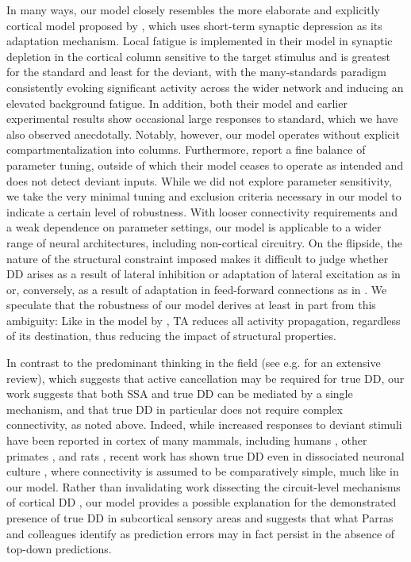 \documentclass[9pt,lineno,onehalfspacing]{elife}
\begin{document}
In many ways, our model closely resembles the more elaborate and explicitly cortical model proposed by \cite{Yarden2017-eh}, which uses short-term synaptic depression as its adaptation mechanism. Local fatigue is implemented in their model in synaptic depletion in the cortical column sensitive to the target stimulus and is greatest for the standard and least for the deviant, with the many-standards paradigm consistently evoking significant activity across the wider network and inducing an elevated background fatigue. In addition, both their model and earlier experimental results \citep{Hershenhoren2014-bb} show occasional large responses to standard, which we have also observed anecdotally. Notably, however, our model operates without explicit compartmentalization into columns. Furthermore, \cite{Yarden2017-eh} report a fine balance of parameter tuning, outside of which their model ceases to operate as intended and does not detect deviant inputs. While we did not explore parameter sensitivity, we take the very minimal tuning and exclusion criteria necessary in our model to indicate a certain level of robustness. With looser connectivity requirements and a weak dependence on parameter settings, our model is applicable to a wider range of neural architectures, including non-cortical circuitry. On the flipside, the nature of the structural constraint imposed makes it difficult to judge whether DD arises as a result of lateral inhibition or adaptation of lateral excitation as in \citep{Yarden2017-eh, Hertag2020-kc, Park2020-oa} or, conversely, as a result of adaptation in feed-forward connections as in \cite{Mill2011-ah}. We speculate that the robustness of our model derives at least in part from this ambiguity: Like in the model by \cite{May2015-lt}, TA reduces all activity propagation, regardless of its destination, thus reducing the impact of structural properties.

In contrast to the predominant thinking in the field (see e.g. \cite{Ross2020-qf} for an extensive review), which suggests that active cancellation may be required for true DD, our work suggests that both SSA and true DD can be mediated by a single mechanism, and that true DD in particular does not require complex connectivity, as noted above. Indeed, while increased responses to deviant stimuli have been reported in cortex of many mammals, including humans \citep{Tada2019-lj}, other primates \citep{Takaura2016-eh}, and rats \citep{Taaseh2011-gg, Shiramatsu2013-qz, Harms2014-ah}, recent work has shown true DD even in dissociated neuronal culture \citep{Kubota2021-dx}, where connectivity is assumed to be comparatively simple, much like in our model. Rather than invalidating work dissecting the circuit-level mechanisms of cortical DD \citep{Hamm2016-lm, Attinger2017-dw, Yarden2022-yy}, our model provides a possible explanation for the demonstrated presence of true DD in subcortical sensory areas \citep{Parras2017-fp} and suggests that what Parras and colleagues identify as prediction errors may in fact persist in the absence of top-down predictions.
\end{document}
